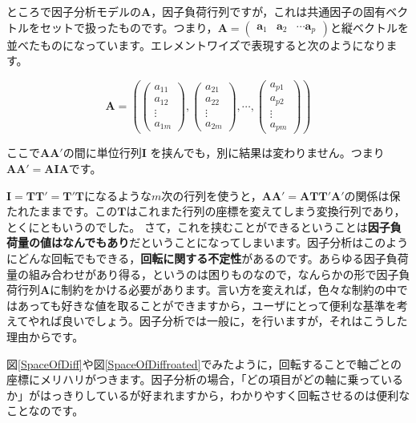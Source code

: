\documentclass{ltjsbook}
\begin{document}
ところで因子分析モデルの$\bm{A}$，因子負荷行列ですが，これは共通因子の固有ベクトルをセットで扱ったものです。つまり，$\bm{A} = \begin{pmatrix}\bm{a}_1 & \bm{a}_2 & \cdots \bm{a}_p \end{pmatrix}$と縦ベクトルを並べたものになっています。エレメントワイズで表現すると次のようになります。

\[
	\bm{A} = \left (
	\begin{pmatrix}  a_{11}\\a_{12}\\\vdots\\ a_{1m} \end{pmatrix},
	\begin{pmatrix}  a_{21}\\a_{22}\\\vdots\\ a_{2m} \end{pmatrix},
	\cdots,
	\begin{pmatrix}  a_{p1}\\a_{p2}\\\vdots\\ a_{pm} \end{pmatrix}
	\right )
\]

ここで$\bm{AA'}$の間に単位行列$\bm{I}$ を挟んでも，別に結果は変わりません。つまり$\bm{AA'}=\bm{AIA}$です。

$\bm{I} = \bm{TT'}=\bm{T'T}$になるような$m$次の行列を使うと，$\bm{AA'} = \bm{ATT'A'}$の関係は保たれたままです。この$\bm{T}$はこれまた行列の座標を変えてしまう変換行列であり，とくにともいうのでした。
さて，これを挟むことができるということは\textbf{因子負荷量の値はなんでもあり}だということになってしまいます。因子分析はこのようにどんな回転でもできる，\textbf{回転に関する不定性}があるのです。あらゆる因子負荷量の組み合わせがあり得る，というのは困りものなので，なんらかの形で因子負荷行列$\bm{A}$に制約をかける必要があります。言い方を変えれば，色々な制約の中ではあっても好きな値を取ることができますから，ユーザにとって便利な基準を考えてやれば良いでしょう。因子分析では一般に，を行いますが，それはこうした理由からです。

図\ref{SpaceOfDiff}や図\ref{SpaceOfDiffroated}でみたように，回転することで軸ごとの座標にメリハリがつきます。因子分析の場合，「どの項目がどの軸に乗っているか」がはっきりしているが好まれますから，わかりやすく回転させるのは便利なことなのです。
\end{document}
